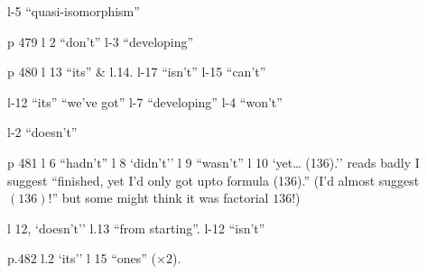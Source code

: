 l-5 ``quasi-isomorphism''

p 479 l 2 ``don't'' \quad l-3 ``developing''

p 480 l 13 ``its'' \& l.14. \quad l-17 ``isn't'' \quad l-15 ``can't''

l-12 ``its'' ``we've got'' \quad l-7 ``developing'' \quad l-4 ``won't''

l-2 ``doesn't''

p 481 l 6 ``hadn't'' \quad l 8 `didn't'' \quad l 9 ``wasn't'' \quad l 10 `yet\ldots{} (136).'' reads badly I suggest ``finished, yet I'd only got upto formula (136).'' (I'd almost suggest $(136)!$'' but some might think it was factorial $136!$)

l 12, `doesn't'' \quad l.13 ``from starting''. \quad l-12 ``isn't''

p.482 l.2 `its'' \quad l 15 ``ones'' ($\times 2$).
